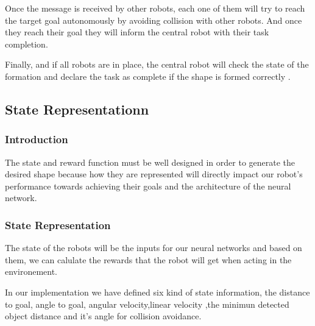 \documentclass[12pt]{extarticle}
\begin{document}
Once the message is received by other robots, each one of them will try to reach the target goal autonomously by avoiding collision with other robots.
And once they reach their goal they will inform the central robot with their task completion.

Finally, and if all robots are in place, the central robot will check  the state of the formation and declare the task  as complete if  the shape is formed correctly .







\subsection{State Representationn}

\subsubsection{Introduction}
The state and reward function must be well designed in order to generate the desired shape because how they are represented will directly impact our robot's performance towards achieving their goals and the architecture of the neural network.


\subsubsection{State Representation}
The state of the robots will be  the inputs for our neural networks and  based on them, we can  calulate  the rewards that the robot will get when acting in the environement.

In our implementation we have defined six kind  of state information, the distance to goal, angle to goal, angular velocity,linear velocity ,the minimun detected object distance and it's angle for collision avoidance.
\end{document}
